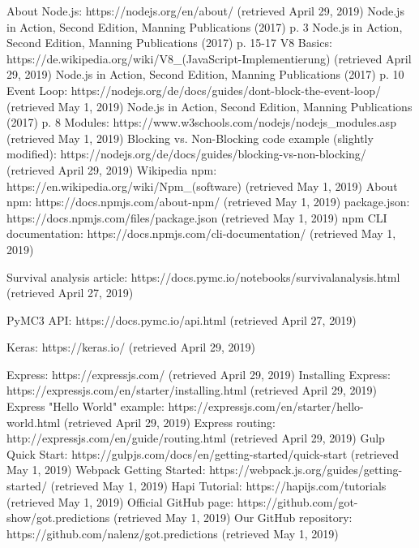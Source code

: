 \documentclass{bioinfo}
\begin{document}
\begin{thebibliography}{}

 About Node.js: https://nodejs.org/en/about/  (retrieved April 29, 2019) 
  Node.js in Action, Second Edition, Manning Publications (2017) p. 3
  Node.js in Action, Second Edition, Manning Publications (2017) p. 15-17
 V8 Basics: https://de.wikipedia.org/wiki/V8\_(JavaScript-Implementierung) (retrieved April 29, 2019)
  Node.js in Action, Second Edition, Manning Publications (2017) p. 10
 Event Loop: https://nodejs.org/de/docs/guides/dont-block-the-event-loop/ (retrieved May 1, 2019)
  Node.js in Action, Second Edition, Manning Publications (2017) p. 8
 Modules: https://www.w3schools.com/nodejs/nodejs\_modules.asp (retrieved May 1, 2019)
 Blocking vs. Non-Blocking code example (slightly modified): https://nodejs.org/de/docs/guides/blocking-vs-non-blocking/ (retrieved April 29, 2019)
 Wikipedia npm: https://en.wikipedia.org/wiki/Npm\_(software) (retrieved May 1, 2019)
 About npm: https://docs.npmjs.com/about-npm/ (retrieved May 1, 2019)
 package.json: https://docs.npmjs.com/files/package.json (retrieved May 1, 2019)
 npm CLI documentation: https://docs.npmjs.com/cli-documentation/ (retrieved May 1, 2019)

  Survival analysis article: https://docs.pymc.io/notebooks/survival{\textunderscore}analysis.html (retrieved April 27, 2019)

 PyMC3 API: https://docs.pymc.io/api.html (retrieved April 27, 2019)

 Keras: https://keras.io/ (retrieved April 29, 2019)

 Express: https://expressjs.com/ (retrieved April 29, 2019)
 Installing Express: https://expressjs.com/en/starter/installing.html (retrieved April 29, 2019)
 Express "Hello World" example: https://expressjs.com/en/starter/hello-world.html (retrieved April 29, 2019)
 Express routing: http://expressjs.com/en/guide/routing.html (retrieved April 29, 2019)
 Gulp Quick Start: https://gulpjs.com/docs/en/getting-started/quick-start (retrieved May 1, 2019)
 Webpack Getting Started: https://webpack.js.org/guides/getting-started/ (retrieved May 1, 2019)
 Hapi Tutorial: https://hapijs.com/tutorials (retrieved May 1, 2019)
 Official GitHub page: https://github.com/got-show/got.predictions (retrieved May 1, 2019)
 Our GitHub repository: https://github.com/nalenz/got.predictions (retrieved May 1, 2019)

\end{thebibliography}
\end{document}
